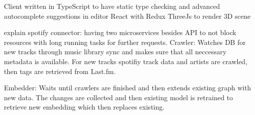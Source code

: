 \documentclass[sigconf]{acmart}
\begin{document}
Client
written in TypeScript to have static type checking and advanced autocomplete suggestions in editor
React with Redux 
ThreeJs to render 3D scene


explain spotify connector:
having two microservices besides API to not block resources with long running tasks for further requests. 
Crawler: Watches DB for new tracks through music library sync and makes sure that all neccessary metadata is available. For new tracks spotifiy track data and artists are crawled, then tags are retrieved from Last.fm.

Embedder: Waits until crawlers are finished and then extends existing graph with new data. The changes are collected and then existing model is retrained to retrieve new embedding which then replaces existing.
\end{document}
